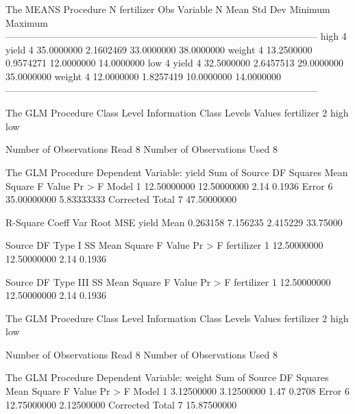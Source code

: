 \documentclass{article}
\begin{document}
\begin{Woutput}
The MEANS Procedure
                N
fertilizer    Obs    Variable    N            Mean         Std Dev         Minimum         Maximum
--------------------------------------------------------------------------------------------------
high            4    yield       4      35.0000000       2.1602469      33.0000000      38.0000000
                     weight      4      13.2500000       0.9574271      12.0000000      14.0000000
low             4    yield       4      32.5000000       2.6457513      29.0000000      35.0000000
                     weight      4      12.0000000       1.8257419      10.0000000      14.0000000
--------------------------------------------------------------------------------------------------

The GLM Procedure
      Class Level Information
Class           Levels    Values
fertilizer           2    high low

Number of Observations Read           8
Number of Observations Used           8

The GLM Procedure
Dependent Variable: yield
                                        Sum of
Source                      DF         Squares     Mean Square    F Value    Pr > F
Model                        1     12.50000000     12.50000000       2.14    0.1936
Error                        6     35.00000000      5.83333333
Corrected Total              7     47.50000000

R-Square     Coeff Var      Root MSE    yield Mean
0.263158      7.156235      2.415229      33.75000

Source                      DF       Type I SS     Mean Square    F Value    Pr > F
fertilizer                   1     12.50000000     12.50000000       2.14    0.1936

Source                      DF     Type III SS     Mean Square    F Value    Pr > F
fertilizer                   1     12.50000000     12.50000000       2.14    0.1936

The GLM Procedure
      Class Level Information
Class           Levels    Values
fertilizer           2    high low

Number of Observations Read           8
Number of Observations Used           8

The GLM Procedure
Dependent Variable: weight
                                        Sum of
Source                      DF         Squares     Mean Square    F Value    Pr > F
Model                        1      3.12500000      3.12500000       1.47    0.2708
Error                        6     12.75000000      2.12500000
Corrected Total              7     15.87500000


\end{Woutput}
\end{document}
